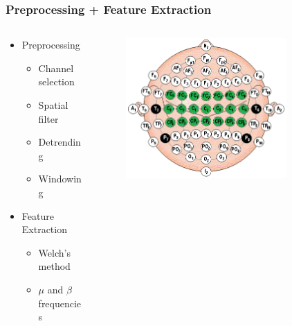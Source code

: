 \documentclass{beamer}
\begin{document}
\begin{frame}
  \frametitle{Preprocessing + Feature Extraction}

  \begin{columns}

  \begin{column}{0.5\textwidth}
      \begin{itemize}
    \item Preprocessing 
	\begin{itemize}
		\item Channel selection
		\item Spatial filter
		\item Detrending
		\item Windowing
	\end{itemize}
	 
    \item Feature Extraction
	\begin{itemize}
		\item Welch's method
		\item $\mu$ and $\beta$ frequencies
	\end{itemize}
  \end{itemize}

  \end{column}
 
  \begin{column}{0.5\textwidth}
     \begin{figure}
  \centering
     \includegraphics[width=0.8\textwidth]{cap.png}
 \end{figure}
  \end{column}
\end{columns}

\end{frame}
\end{document}
